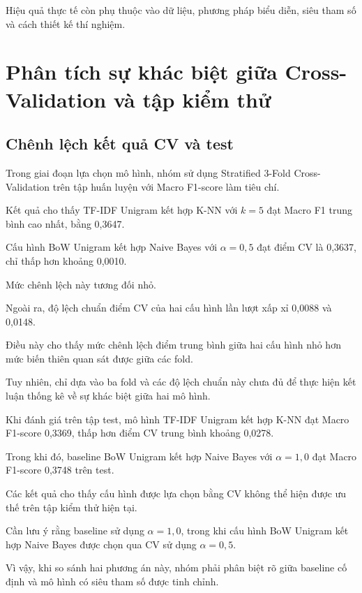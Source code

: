 Hiệu quả thực tế còn phụ thuộc vào dữ liệu,
phương pháp biểu diễn, siêu tham số và
cách thiết kế thí nghiệm.



\section{Phân tích sự khác biệt giữa Cross-Validation và tập kiểm thử}

\subsection{Chênh lệch kết quả CV và test}

Trong giai đoạn lựa chọn mô hình, nhóm sử dụng
Stratified 3-Fold Cross-Validation trên tập
huấn luyện với Macro F1-score làm tiêu chí.

Kết quả cho thấy TF-IDF Unigram kết hợp K-NN
với $k=5$ đạt Macro F1 trung bình cao nhất,
bằng 0,3647.

Cấu hình BoW Unigram kết hợp Naive Bayes
với $\alpha=0,5$ đạt điểm CV là 0,3637,
chỉ thấp hơn khoảng 0,0010.

Mức chênh lệch này tương đối nhỏ.

Ngoài ra, độ lệch chuẩn điểm CV của hai cấu
hình lần lượt xấp xỉ 0,0088 và 0,0148.

Điều này cho thấy mức chênh lệch điểm trung
bình giữa hai cấu hình nhỏ hơn mức biến thiên
quan sát được giữa các fold.

Tuy nhiên, chỉ dựa vào ba fold và các độ lệch
chuẩn này chưa đủ để thực hiện kết luận
thống kê về sự khác biệt giữa hai mô hình.

Khi đánh giá trên tập test, mô hình TF-IDF
Unigram kết hợp K-NN đạt Macro F1-score
0,3369, thấp hơn điểm CV trung bình khoảng
0,0278.

Trong khi đó, baseline BoW Unigram kết hợp
Naive Bayes với $\alpha=1,0$ đạt Macro
F1-score 0,3748 trên test.

Các kết quả cho thấy cấu hình được lựa chọn
bằng CV không thể hiện được ưu thế trên
tập kiểm thử hiện tại.

Cần lưu ý rằng baseline sử dụng $\alpha=1,0$,
trong khi cấu hình BoW Unigram kết hợp Naive Bayes
được chọn qua CV sử dụng $\alpha=0,5$.

Vì vậy, khi so sánh hai phương án này, nhóm
phải phân biệt rõ giữa baseline cố định và
mô hình có siêu tham số được tinh chỉnh.



